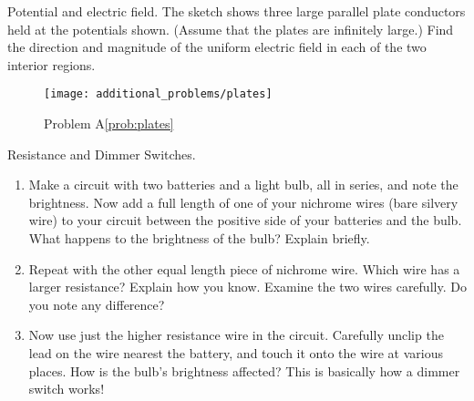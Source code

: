 \newpage

\begin{aproblem}{Potential and electric field.} 
  The sketch shows three large parallel plate conductors held at the
  potentials shown. (Assume that the plates are infinitely large.)
  Find the direction and magnitude of the uniform electric field in
  each of the two interior regions. \label{prob:plates}
  \begin{figure}[h]
    \begin{center}
      \texttt{[image: additional\_problems/plates]}
      \caption{Problem A\ref{prob:plates}}
    \end{center}
  \end{figure}
\end{aproblem}


\begin{aproblem}{Resistance and Dimmer Switches.}
  \begin{enumerate}
  \item Make a circuit with two batteries and a light bulb, all in
    series, and note the brightness.  Now add a full length of one of
    your nichrome wires (bare silvery wire) to your circuit between
    the positive side of your batteries and the bulb.  What happens to
    the brightness of the bulb?  Explain briefly.
  \item Repeat with the other equal length piece of nichrome wire.
    Which wire has a larger resistance? %
    Explain how you know.  Examine the two wires carefully.  Do you
    note any difference?
  \item Now use just the higher resistance wire in the circuit.
    Carefully unclip the lead on the wire nearest the battery, and
    touch it onto the wire at various places.  How is the bulb's
    brightness affected?  This is basically how a dimmer switch works!
  \end{enumerate}
  \label{prob:dimmer}
\end{aproblem}

